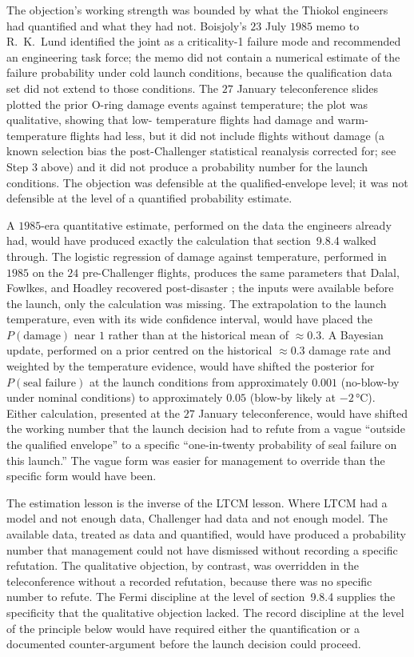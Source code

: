 The objection's working strength was bounded by what the
Thiokol engineers had quantified and what they had not. Boisjoly's
$23$ July $1985$ memo to R.~K.~Lund \cite{paper:ch09t3-boisjoly-1985}
identified the joint as a criticality-1 failure mode and
recommended an engineering task force; the memo did not contain
a numerical estimate of the failure probability under cold
launch conditions, because the qualification data set did not
extend to those conditions. The $27$ January teleconference
slides plotted the prior O-ring damage events against
temperature; the plot was qualitative, showing that low-
temperature flights had damage and warm-temperature flights had
less, but it did not include flights without damage (a known
selection bias the post-Challenger statistical reanalysis
corrected for; see Step 3 above) and it did not produce a
probability number for the launch conditions. The objection was
defensible at the qualified-envelope level; it was not defensible
at the level of a quantified probability estimate.

A $1985$-era quantitative estimate, performed on the data the
engineers already had, would have produced exactly the
calculation that section~9.8.4 walked through. The logistic
regression of damage against temperature, performed in $1985$
on the $24$ pre-Challenger flights, produces the same parameters
that Dalal, Fowlkes, and Hoadley recovered post-disaster
\cite{ch09-paper:dalal-challenger-1989}; the inputs were available
before the launch, only the calculation was missing. The
extrapolation to the launch temperature, even with its wide
confidence interval, would have placed the $P(\text{damage})$
near $1$ rather than at the historical mean of $\approx 0.3$. A
Bayesian update, performed on a prior centred on the historical
$\approx 0.3$ damage rate and weighted by the temperature
evidence, would have shifted the posterior for $P(\text{seal
failure})$ at the launch conditions from approximately $0.001$
(no-blow-by under nominal conditions) to approximately $0.05$
(blow-by likely at $-2 \,\si{\degreeCelsius}$). Either
calculation, presented at the $27$ January teleconference, would
have shifted the working number that the launch decision had
to refute from a vague ``outside the qualified envelope'' to a
specific ``one-in-twenty probability of seal failure on this
launch.'' The vague form was easier for management to override
than the specific form would have been.

The estimation lesson is the inverse of the LTCM lesson. Where
LTCM had a model and not enough data, Challenger had data and
not enough model. The available data, treated as data and
quantified, would have produced a probability number that
management could not have dismissed without recording a
specific refutation. The qualitative objection, by contrast,
was overridden in the teleconference without a recorded
refutation, because there was no specific number to refute.
The Fermi discipline at the level of section~9.8.4 supplies
the specificity that the qualitative objection lacked. The
record discipline at the level of the principle below would
have required either the quantification or a documented
counter-argument before the launch decision could proceed.

